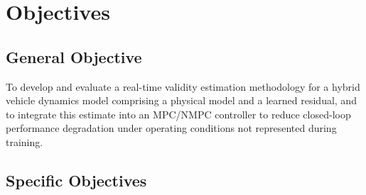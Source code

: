 \documentclass[12pt,a4paper]{report}
\begin{document}

\chapter{Objectives}

\section{General Objective}

To develop and evaluate a real-time validity estimation methodology for a hybrid vehicle dynamics model comprising a physical model and a learned residual, and to integrate this estimate into an MPC/NMPC controller to reduce closed-loop performance degradation under operating conditions not represented during training.

\section{Specific Objectives}

\end{document}
